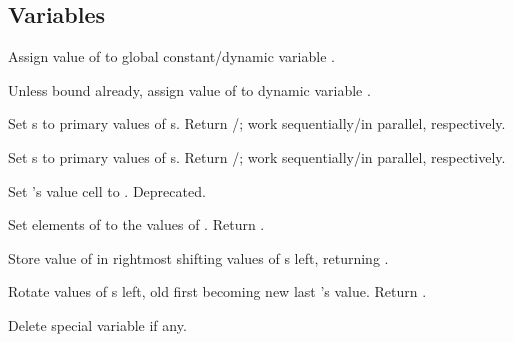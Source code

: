 \subsection{Variables}

\begin{LIST}{1cm}

  {
    Assign value of  to global constant/dynamic variable .
  }

  {
    Unless bound already, assign value of  to dynamic variable
    .
  }

  {
    Set s to primary values of s. Return /\retval{\NIL}; work sequentially/in parallel, respectively.
  }

  {
    Set s to primary values of s. Return /\retval{\NIL}; work sequentially/in parallel, respectively.
  }

  {
    Set 's value cell to . Deprecated.
  }

  {
    Set elements of  to the values of
    . Return .
  }

  {
    Store value of  in rightmost  shifting values of
    s left, returning .
  }

  {
    Rotate values of s left, old first becoming new last
    's value. Return \retval{\NIL}.
  }

  {
    Delete special variable  if any.
  }


\end{LIST}
